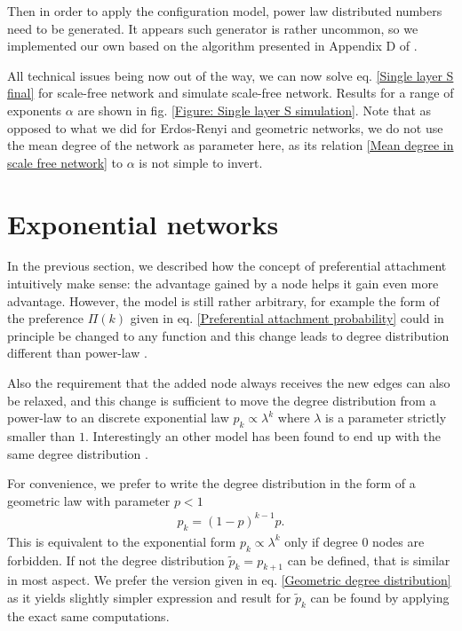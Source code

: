 \documentclass[
11pt, %
english, %
singlespacing, %
nolistspacing, %
liststotoc, %
headsepline, %
]{MastersDoctoralThesis} %
\begin{document}
Then in order to apply the configuration model, power law distributed numbers need to be generated. It appears such generator is rather uncommon, so we implemented our own based on the algorithm presented in Appendix D of \cite{clauset2009power}.

All technical issues being now out of the way, we can now solve eq. \eqref{Single layer S final} for scale-free network and simulate scale-free network. Results for a range of exponents $\alpha$ are shown in fig. \ref{Figure: Single layer S simulation}. Note that as opposed to what we did for Erdos-Renyi and geometric networks, we do not use the mean degree of the network as parameter here, as its relation \eqref{Mean degree in scale free network} to $\alpha$ is not simple to invert.

\section{Exponential networks}
\label{Section: Exponential networks}

In the previous section, we described how the concept of preferential attachment intuitively make sense: the advantage gained by a node helps it gain even more advantage. However, the model is still rather arbitrary, for example the form of the preference $\Pi(k)$ given in eq. \eqref{Preferential attachment probability} could in principle be changed to any function and this change leads to degree distribution different than power-law \cite{krapivsky2000connectivity}.

Also the requirement that the added node always receives the new edges can also be relaxed, and this change is sufficient to move the degree distribution from a power-law to an discrete exponential law
\cite{callaway2001randomly} $p_k \propto \lambda^{k}$ where $\lambda$ is a parameter strictly smaller than $1$. Interestingly an other model has been found to end up with the same degree distribution \cite{jing2005exponential}.

For convenience, we prefer to write the degree distribution in the form of a geometric law with parameter $p < 1$
\begin{align}
	p_k = (1 - p)^{k-1} p. \label{Geometric degree distribution}
\end{align}
This is equivalent to the exponential form $p_k \propto \lambda^{k}$ only if degree $0$ nodes are forbidden. If not the degree distribution $\tilde{p}_k = p_{k + 1}$ can be defined, that is similar in most aspect. We prefer the version given in eq. \eqref{Geometric degree distribution} as it yields slightly simpler expression and result for $\tilde{p}_k$ can be found by applying the exact same computations.
\end{document}
